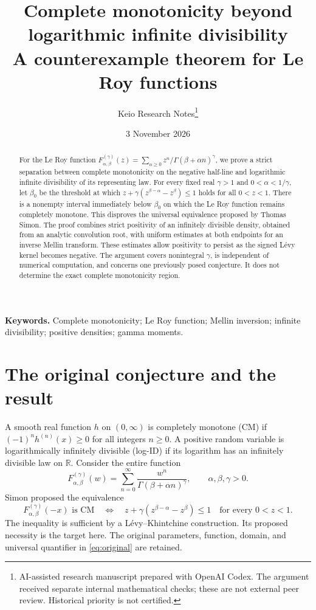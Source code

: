 \documentclass[11pt,a4paper]{article}
\title{Complete monotonicity beyond logarithmic infinite divisibility\\[5pt]
\large A counterexample theorem for Le Roy functions}
\author{Keio Research Notes\thanks{AI-assisted research manuscript prepared with OpenAI Codex. The argument received separate internal mathematical checks; these are not external peer review. Historical priority is not certified.}}
\date{3 November 2026}
\numberwithin{equation}{section}
\theoremstyle{definition}\newtheorem{definition}[theorem]{Definition}
\theoremstyle{remark}\newtheorem{remark}[theorem]{Remark}
\newcommand{\R}{\mathbb R}
\begin{document}
\maketitle
\begin{abstract}
For the Le Roy function
\(F_{\alpha,\beta}^{(\gamma)}(z)=\sum_{n\ge0}z^n/\Gamma(\beta+\alpha n)^\gamma\),
we prove a strict separation between complete monotonicity on the negative
half-line and logarithmic infinite divisibility of its representing law.
For every fixed real \(\gamma>1\) and \(0<\alpha<1/\gamma\), let
\(\beta_0\) be the threshold at which
\(z+\gamma(z^{\beta-\alpha}-z^\beta)\le1\) holds for all \(0<z<1\).
There is a nonempty interval immediately below \(\beta_0\) on which the
Le Roy function remains completely monotone. This disproves the universal
equivalence proposed by Thomas Simon. The proof combines strict positivity
of an infinitely divisible density, obtained from an analytic convolution
root, with uniform estimates at both endpoints for an inverse Mellin
transform. These estimates allow positivity to persist as the signed
L\'evy kernel becomes negative. The argument covers nonintegral
\(\gamma\), is independent of numerical computation, and concerns one
previously posed conjecture. It does not determine the exact complete
monotonicity region.
\end{abstract}

\noindent\textbf{Keywords.} Complete monotonicity; Le Roy function; Mellin
inversion; infinite divisibility; positive densities; gamma moments.

\section{The original conjecture and the result}

A smooth real function \(h\) on \((0,\infty)\) is completely monotone
(CM) if \((-1)^n h^{(n)}(x)\ge0\) for all integers \(n\ge0\).
A positive random variable is logarithmically infinitely divisible
(log-ID) if its logarithm has an infinitely divisible law on \(\R\).
Consider the entire function
\begin{equation}\label{eq:F}
 F_{\alpha,\beta}^{(\gamma)}(w)
 =\sum_{n=0}^{\infty}\frac{w^n}{\Gamma(\beta+\alpha n)^\gamma},
 \qquad \alpha,\beta,\gamma>0.
\end{equation}
Simon \cite[Section 3]{Simon} proposed the equivalence
\begin{equation}\label{eq:original}
 F_{\alpha,\beta}^{(\gamma)}(-x)\text{ is CM}
 \quad\Longleftrightarrow\quad
 z+\gamma(z^{\beta-\alpha}-z^\beta)\le1
 \quad\text{for every }0<z<1.
\end{equation}
The inequality is sufficient by a L\'evy--Khintchine construction.
Its proposed necessity is the target here. The original parameters,
function, domain, and universal quantifier in \eqref{eq:original} are
retained.
\end{document}
